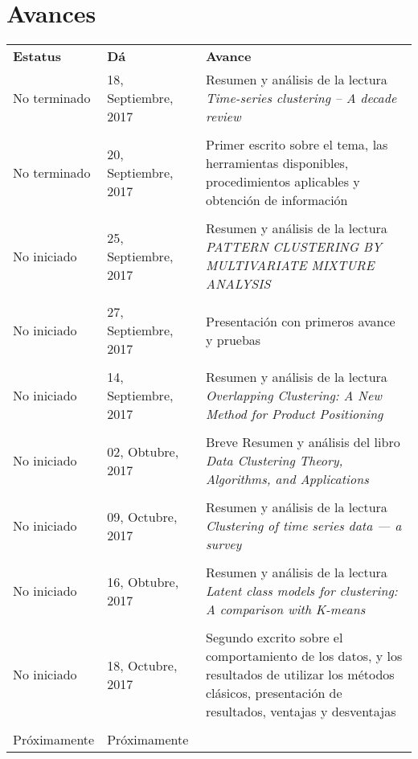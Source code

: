 \documentclass[12pt,oneside]{book}
\begin{document}
\section{Avances}
\begin{tabular}{|p{2cm}|p{4cm}|p{12cm}|}
  \textbf{Estatus} & \textbf{D\'a} & \textbf{Avance} \\
   No terminado & 18, Septiembre, 2017 & Resumen y an\'alisis  de la lectura \textit{Time-series clustering – A decade review} \\
   \hline\\
   No terminado & 20, Septiembre, 2017 & Primer escrito sobre el tema, las herramientas disponibles, procedimientos aplicables y obtenci\'on de informaci\'on\\
   \hline\\
   No iniciado & 25, Septiembre, 2017 & Resumen y an\'alisis  de la lectura \textit{PATTERN CLUSTERING BY MULTIVARIATE MIXTURE ANALYSIS}\\
   \hline\\
   No iniciado & 27, Septiembre, 2017 & Presentaci\'on con primeros avance y pruebas\\
   \hline\\
   No iniciado & 14, Septiembre, 2017 & Resumen y an\'alisis  de la lectura \textit{Overlapping Clustering: A New Method for Product Positioning}\\
   \hline\\
   No iniciado & 02, Obtubre, 2017 & Breve Resumen y an\'alisis  del libro \textit{Data Clustering Theory, Algorithms, and Applications}\\
   \hline\\
   No iniciado & 09, Octubre, 2017 & Resumen y an\'alisis  de la lectura \textit{Clustering of time series data — a survey}\\
   \hline\\
   No iniciado & 16, Obtubre, 2017 & Resumen y an\'alisis  de la lectura \textit{Latent class models for clustering: A comparison with K-means}\\
   \hline\\
   No iniciado & 18, Octubre, 2017 & Segundo excrito sobre el comportamiento de los datos, y los resultados de utilizar los m\'etodos cl\'asicos, presentaci\'on de resultados, ventajas y desventajas\\
   \hline\\
   Pr\'oximamente & Pr\'oximamente\\
\end{tabular}
\end{document}
